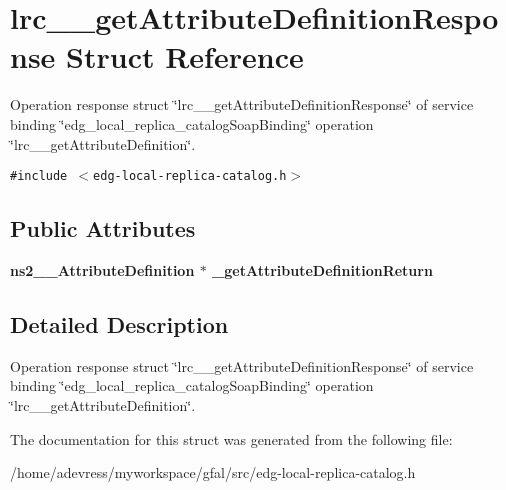 \section{lrc\_\-\_\-get\-Attribute\-Definition\-Response Struct Reference}
\label{structlrc____getAttributeDefinitionResponse}
Operation response struct \char`\"{}lrc\_\-\_\-get\-Attribute\-Definition\-Response\char`\"{} of service binding \char`\"{}edg\_\-local\_\-replica\_\-catalog\-Soap\-Binding\char`\"{} operation \char`\"{}lrc\_\-\_\-get\-Attribute\-Definition\char`\"{}.  


{\tt \#include $<$edg-local-replica-catalog.h$>$}

\subsection*{Public Attributes}
\begin{CompactItemize}
\item 
\bf{ns2\_\-\_\-Attribute\-Definition} $\ast$ \textbf{\_\-get\-Attribute\-Definition\-Return}\label{structlrc____getAttributeDefinitionResponse_91dc1be1aca2d3d5aeda754196feddca}

\end{CompactItemize}


\subsection{Detailed Description}
Operation response struct \char`\"{}lrc\_\-\_\-get\-Attribute\-Definition\-Response\char`\"{} of service binding \char`\"{}edg\_\-local\_\-replica\_\-catalog\-Soap\-Binding\char`\"{} operation \char`\"{}lrc\_\-\_\-get\-Attribute\-Definition\char`\"{}. 



The documentation for this struct was generated from the following file:\begin{CompactItemize}
\item 
/home/adevress/myworkspace/gfal/src/edg-local-replica-catalog.h\end{CompactItemize}
